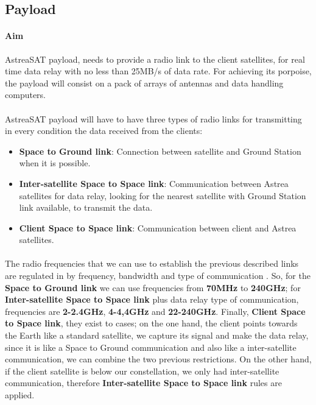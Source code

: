 \subsection{Payload}
\paragraph{Aim} AstreaSAT payload, needs to provide a radio link to the client satellites, for real time data relay with no less than 25MB/s of data rate. For achieving its porpoise, the payload will consist on a pack of arrays of antennas and data handling computers.

\paragraph{}AstreaSAT payload will have to have three types of radio links for transmitting in every condition the data received from the clients:
\begin{itemize}
	\item \textbf{Space to Ground link}: Connection between satellite and Ground Station when it is possible.
	\item \textbf{Inter-satellite Space to Space link}: Communication between Astrea satellites for data relay, looking for the nearest satellite with Ground Station link available, to transmit the data.
	\item \textbf{Client Space to Space link}: Communication between client and Astrea satellites.
\end{itemize}
\paragraph{}
The radio frequencies that we can use to establish the previous described links are regulated in \cite{SecretariadeEstadodetelecomunicacionesyparalasociedaddelainformacion.2015} by frequency, bandwidth and type of communication . So, for the \textbf{Space to Ground link} we can use frequencies from \textbf{70MHz} to \textbf{240GHz}; for \textbf{Inter-satellite Space to Space link} plus data relay type of communication, frequencies are \textbf{2-2.4GHz}, \textbf{4-4,4GHz} and \textbf{22-240GHz}. Finally, \textbf{Client Space to Space link}, they exist to cases; on the one hand, the client points towards the Earth like a standard satellite, we capture its signal and make the data relay, since it is like a Space to Ground communication and also like a inter-satellite communication, we can combine the two previous restrictions. On the other hand, if the client satellite is below our constellation, we only had inter-satellite communication, therefore \textbf{Inter-satellite Space to Space link} rules are applied.

